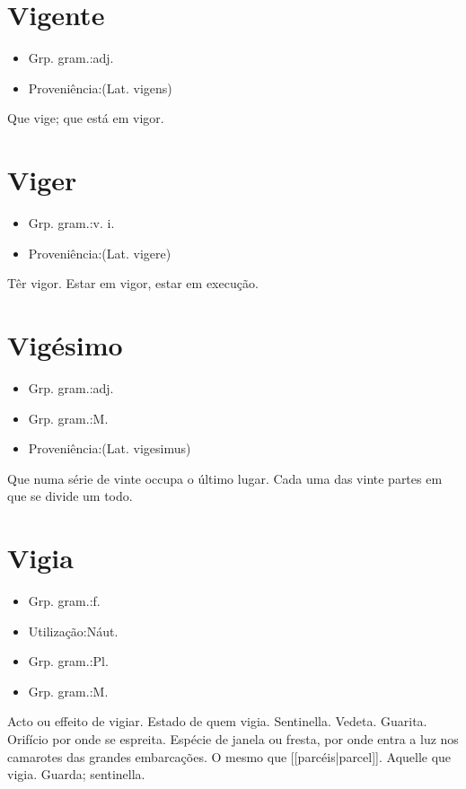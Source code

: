 \documentclass{article}
\begin{document}
\section{Vigente}
\begin{itemize}
\item {Grp. gram.:adj.}
\end{itemize}
\begin{itemize}
\item {Proveniência:(Lat. \textunderscore vigens\textunderscore )}
\end{itemize}
Que vige; que está em vigor.
\section{Viger}
\begin{itemize}
\item {Grp. gram.:v. i.}
\end{itemize}
\begin{itemize}
\item {Proveniência:(Lat. \textunderscore vigere\textunderscore )}
\end{itemize}
Têr vigor.
Estar em vigor, estar em execução.
\section{Vigésimo}
\begin{itemize}
\item {Grp. gram.:adj.}
\end{itemize}
\begin{itemize}
\item {Grp. gram.:M.}
\end{itemize}
\begin{itemize}
\item {Proveniência:(Lat. \textunderscore vigesimus\textunderscore )}
\end{itemize}
Que numa série de vinte occupa o último lugar.
Cada uma das vinte partes em que se divide um todo.
\section{Vigia}
\begin{itemize}
\item {Grp. gram.:f.}
\end{itemize}
\begin{itemize}
\item {Utilização:Náut.}
\end{itemize}
\begin{itemize}
\item {Grp. gram.:Pl.}
\end{itemize}
\begin{itemize}
\item {Grp. gram.:M.}
\end{itemize}
Acto ou effeito de vigiar.
Estado de quem vigia.
Sentinella.
Vedeta.
Guarita.
Orifício por onde se espreita.
Espécie de janela ou fresta, por onde entra a luz nos camarotes das grandes embarcações.
O mesmo que [[parcéis|parcel]].
Aquelle que vigia.
Guarda; sentinella.
\end{document}
